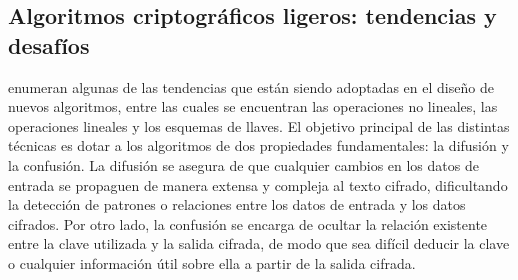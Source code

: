 \documentclass[a4paper,10pt]{article}
\begin{document}
	\subsection{Algoritmos criptográficos ligeros: tendencias y desafíos}
	\label{sec.2.1}
	\textcite{biryukov2017state} enumeran algunas de las tendencias que están siendo adoptadas en el diseño de nuevos algoritmos, entre las cuales se encuentran las operaciones no lineales, las operaciones lineales y los esquemas de llaves. El objetivo principal de las distintas técnicas es dotar a los algoritmos de dos propiedades fundamentales: la difusión y la confusión. La difusión se asegura de que cualquier cambios en los datos de entrada se propaguen de manera extensa y compleja al texto cifrado, dificultando la detección de patrones o relaciones entre los datos de entrada y los datos cifrados. Por otro lado, la confusión se encarga de ocultar la relación existente entre la clave utilizada y la salida cifrada, de modo que sea difícil deducir la clave o cualquier información útil sobre ella a partir de la salida cifrada.
	
\end{document}
